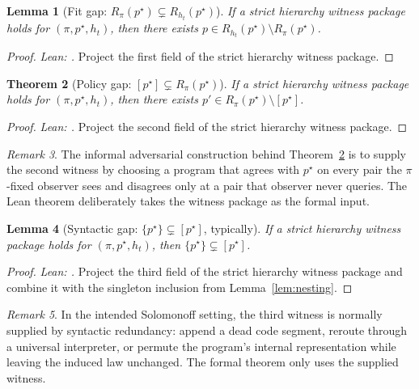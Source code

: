 \documentclass[11pt]{article}
\newtheorem{theorem}{Theorem}[section]
\newtheorem{lemma}[theorem]{Lemma}
\theoremstyle{definition}
\theoremstyle{remark}
\newtheorem{remark}[theorem]{Remark}
\theoremstyle{plain}
\theoremstyle{definition}
\begin{document}
\begin{lemma}[{Fit gap: $R_\pi(p^\star)\subsetneq R_{h_t}(p^\star)$}]
\label{lem:fit-gap}
If a strict hierarchy witness package holds for $(\pi,p^\star,h_t)$, then there exists $p\in R_{h_t}(p^\star)\setminus R_\pi(p^\star)$.
\end{lemma}

\begin{proof}
\noindent\emph{Lean: .}
Project the first field of the strict hierarchy witness package.
\end{proof}

\begin{theorem}[{Policy gap: $[p^\star]\subsetneq R_\pi(p^\star)$}]
\label{thm:policy-gap}
If a strict hierarchy witness package holds for $(\pi,p^\star,h_t)$, then there exists $p'\in R_\pi(p^\star)\setminus[p^\star]$.
\end{theorem}

\begin{proof}
\noindent\emph{Lean: .}
Project the second field of the strict hierarchy witness package.
\end{proof}

\begin{remark}
The informal adversarial construction behind Theorem~\ref{thm:policy-gap} is to supply the second witness by choosing a program that agrees with $p^\star$ on every pair the $\pi$-fixed observer sees and disagrees only at a pair that observer never queries. The Lean theorem deliberately takes the witness package as the formal input.
\end{remark}

\begin{lemma}[{Syntactic gap: $\{p^\star\}\subsetneq [p^\star]$, typically}]
\label{lem:syntactic-gap}
If a strict hierarchy witness package holds for $(\pi,p^\star,h_t)$, then $\{p^\star\}\subsetneq[p^\star]$.
\end{lemma}

\begin{proof}
\noindent\emph{Lean: .}
Project the third field of the strict hierarchy witness package and combine it with the singleton inclusion from Lemma~\ref{lem:nesting}.
\end{proof}

\begin{remark}
In the intended Solomonoff setting, the third witness is normally supplied by syntactic redundancy: append a dead code segment, reroute through a universal interpreter, or permute the program's internal representation while leaving the induced law unchanged. The formal theorem only uses the supplied witness.
\end{remark}
\end{document}

